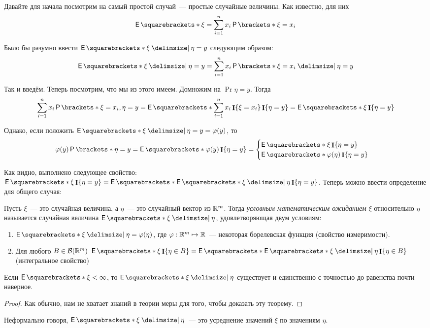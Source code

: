 Давайте для начала посмотрим на самый простой случай~--- простые случайные величины. Как известно, для них
\[
	\E{\xi} = \sum_{i = 1}^{n} x_i\Pr{\xi = x_i}
\]

Было бы разумно ввести \(\E{\xi \given \eta = y}\) следующим образом:
\[
	\E{\xi \given \eta = y} = \sum_{i = 1}^{n} x_i\Pr{\xi = x_i \given \eta = y}
\]

Так и введём. Теперь посмотрим, что мы из этого имеем. Домножим на \(\Pr{\eta = y}\). Тогда
\begin{align*}
	\sum_{i = 1}^{n} x_i\Pr{\xi = x_i, \eta = y} = \E{\sum_{i = 1}^{n} x_i\I\{\xi = x_i\}\I\{\eta = y\}} = \E{\xi\I\{\eta = y\}}
\end{align*}

Однако, если положить \(\E{\xi \given \eta = y} = \phi(y)\), то
\[
	\phi(y)\Pr{\eta = y} = \E{\phi(y)\I\{\eta = y\}} = \begin{cases}
	\E{\xi\I\{\eta = y\}} \\
	\E{\phi(\eta)\I\{\eta = y\}}
	\end{cases}
\]

Как видно, выполнено следующее свойство: \(\E{\xi\I\{\eta = y\}} = \E{\E{\xi \given \eta}\I\{\eta = y\}}\). Теперь можно ввести определение для общего случая:

\begin{definition}
	Пусть \(\xi\)~--- это случайная величина, а \(\eta\)~--- это случайный вектор из \(\mathbb{R}^{m}\). Тогда \emph{условным математическим ожиданием} \(\xi\) относительно \(\eta\) называется случайная величина \(\E{\xi \given \eta}\), удовлетворяющая двум условиям:
	\begin{enumerate}
		\item \(\E{\xi \given \eta} = \phi(\eta)\), где \(\varphi : \mathbb{R}^m \mapsto \mathbb{R}\)~--- некоторая борелевская функция (свойство измеримости).
		\item Для любого \(B \in \mathcal{B}(\mathbb{R}^m)\) \(\E{\xi\I\{\eta \in B\}} = \E{\E{\xi \given \eta}\I\{\eta \in B\}}\) (интегральное свойство)
	\end{enumerate}
\end{definition}

\begin{theorem}
	Если \(\E{\xi} < \infty\), то \(\E{\xi \given \eta}\) существует и единственно с точностью до равенства почти наверное.
\end{theorem}
\begin{proof}
	Как обычно, нам не хватает знаний в теории меры для того, чтобы доказать эту теорему.
\end{proof}

Неформально говоря, \(\E{\xi \given \eta}\)~--- это усреднение значений \(\xi\) по значениям \(\eta\).